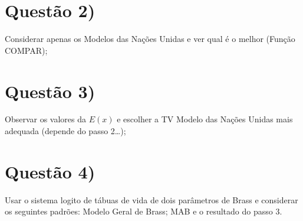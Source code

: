 \documentclass[
  12pt,
  a4paper,
]{scrreprt}
\begin{document}
\section{Questão 2)}\label{questuxe3o-2}

Considerar apenas os Modelos das Nações Unidas e ver qual é o melhor
(Função COMPAR);

\section{Questão 3)}\label{questuxe3o-3}

Observar os valores da \(E\left(x\right)\) e escolher a TV Modelo das
Nações Unidas mais adequada (depende do passo 2\ldots);

\section{Questão 4)}\label{questuxe3o-4}

Usar o sistema logito de tábuas de vida de dois parâmetros de Brass e
considerar os seguintes padrões: Modelo Geral de Brass; MAB e o
resultado do passo 3.
\end{document}
